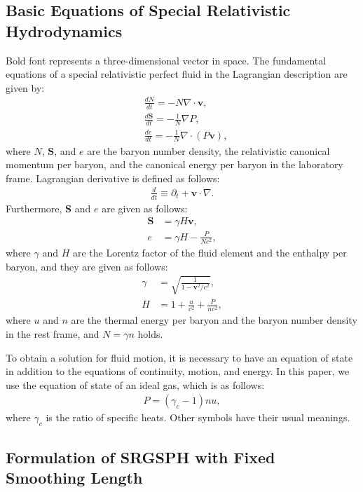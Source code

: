 \documentclass[]{aastex631}
\begin{document}
\subsection{Basic Equations of Special Relativistic Hydrodynamics}
Bold font represents a three-dimensional vector in space.
The fundamental equations of a special relativistic perfect fluid in the Lagrangian description are given by:
\begin{align}
\label{eq:EoC}
&\frac{dN}{dt}=-N\nabla\cdot\bm{v},\\
\label{eq:EoM}
&\frac{d\bm{S}}{dt}=-\frac{1}{N}\nabla P,\\
\label{eq:EoE}
&\frac{de}{dt}=-\frac{1}{N}\nabla\cdot (P\bm{v}),
\end{align}
where $N$, $\bm{S}$, and $e$ are the baryon number density, the relativistic canonical momentum per baryon, and the canonical energy per baryon in the laboratory frame.
Lagrangian derivative is defined as follows:
\begin{align}
\frac{d}{dt} \equiv \partial_t + \bm{v}\cdot\nabla.
\end{align}
Furthermore, $\bm{S}$ and $e$ are given as follows:
\begin{align}
\label{eq:S}
  \bm{S}   &= \gamma H \bm{v},\\
\label{eq:e}
  e &= \gamma H -\frac{P}{Nc^2},
\end{align}
where $\gamma$ and $H$ are the Lorentz factor of the fluid element and the enthalpy per baryon, and they are given as follows:
\begin{align}
  \gamma &= \sqrt{\frac{1}{1-\bm{v}^2/c^2}},\\
  H      &= 1 + \frac{u}{c^2} + \frac{P}{nc^2},
\end{align}
where $u$ and $n$ are the thermal energy per baryon and the baryon number density in the rest frame, and $N=\gamma n$ holds.

To obtain a solution for fluid motion, it is necessary to have an equation of state in addition to the equations of continuity, motion, and energy.
In this paper, we use the equation of state of an ideal gas, which is as follows:
\begin{align}
\label{eq:EoS}
    P = (\gamma_c-1)nu,
\end{align}
where $\gamma_c$ is the ratio of specific heats.
Other symbols have their usual meanings.

\subsection{Formulation of SRGSPH with Fixed Smoothing Length}
\end{document}
